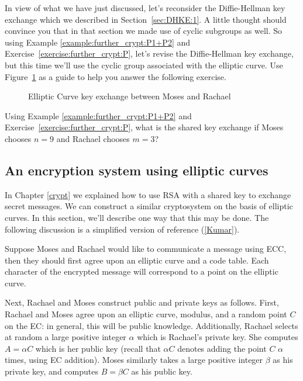 In view of what we have just discussed, let's reconsider the Diffie-Hellman key exchange which we described in Section~\ref{sec:DHKE:1}. A little thought should convince you that in that section we made use of cyclic subgroups as well. So using Example \ref{example:further_crypt:P1+P2} and Exercise~\ref{exercise:further_crypt:P}, let's revise the Diffie-Hellman key exchange, but this time we'll use the cyclic group associated with the elliptic curve.  Use Figure~\ref{fig:DH:DHKE_8} as a guide to help you answer the following exercise.

\begin{figure}[htbp]
	  \caption{\label{fig:DH:DHKE_8} Elliptic Curve key exchange between Moses and Rachael }
\end{figure}

\begin{exer}
Using Example \ref{example:further_crypt:P1+P2} and Exercise~\ref{exercise:further_crypt:P}, what is the shared key exchange if Moses chooses $n = 9$ and Rachael chooses $m = 3$?
\end{exer}
\subsection{An encryption system using elliptic curves} 
In Chapter \ref{crypt} we explained how to use RSA with a shared key to exchange secret messages.  We can construct a similar cryptosystem on the basis of elliptic curves. In this section, we'll describe one way that this may be done. The following discussion is a simplified version of reference (\ref{Kumar}).

Suppose Moses and Rachael would like to communicate a message using ECC, then they should first agree upon an elliptic curve and a code table. Each character of the encrypted message will correspond to a point on the elliptic curve.

Next, Rachael and Moses construct public and private keys as follows. First, Rachael and Moses agree upon an elliptic curve, modulus, and a random point $C$ on the EC: in general, this will be public knowledge.  Additionally, Rachael selects at  random a large positive integer $\alpha$ which is  Rachael's private key. She computes $A = \alpha C$ which is her public key (recall that $\alpha C$ denotes adding the point $C$ $\alpha$ times, using EC addition). Moses similarly takes a large positive integer $\beta$ as his private key, and computes $B = \beta C$ as his public key.

